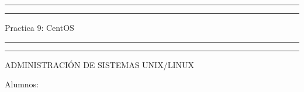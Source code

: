 \documentclass[a4paper, 11pt, oneside]{article}
\begin{document}
 

\begin{titlepage} 

	\centering 
	
	\scshape 
	
	\vspace*{\baselineskip} 
	
	
	
	\rule{\textwidth}{1.6pt}\vspace*{-\baselineskip}\vspace*{2pt} 
	\rule{\textwidth}{0.4pt} 
	
	\vspace{0.75\baselineskip} 
	
	{\LARGE Practica 9: CentOS}	
	\vspace{0.75\baselineskip} 
	
	\rule{\textwidth}{0.4pt}\vspace*{-\baselineskip}\vspace{3.2pt}
	\rule{\textwidth}{1.6pt} 
	
	\vspace{2\baselineskip} 
	

	ADMINISTRACIÓN DE SISTEMAS UNIX/LINUX
	
	\vspace*{3\baselineskip} 
	
	
	
	Alumnos:
	
	\vspace{0.5\baselineskip} 
	

\end{titlepage}
\end{document}
